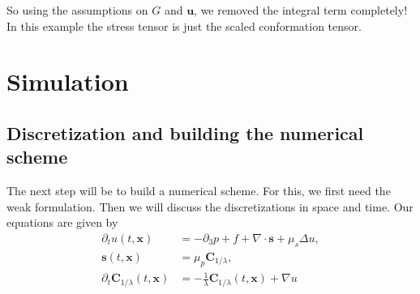 \documentclass[12pt,a4paper,twoside, open=right]{scrreprt}
\theoremstyle{definition}
\theoremstyle{plain}
\newcommand{\bfu}{\bm{u}}
\newcommand{\bfs}{\bm{s}}
\newcommand{\bfC}{\bm{C}}
\newcommand{\bfx}{\bm{x}}
\begin{document}
So using the assumptions on $G$ and $\bfu$, we removed the integral term completely! In this example the stress tensor is just the scaled conformation tensor. 
\chapter{Simulation}
\section{Discretization and building the numerical scheme}
The next step will be to build a numerical scheme. For this, we first need the weak formulation. Then we will discuss the discretizations in space and time. Our equations are given by 
\begin{align}
    \label{eq:transfeq1}
    \partial_t u(t,\bfx) &= -\partial_3 p + f +\nabla\cdot \bfs+\mu_s\Delta u,\\
    \label{eq:transfeq2}
    \bfs(t,\bfx)&=\mu_p\bfC_{1/\lambda},\\
    \partial_t\bfC_{1/\lambda}(t,\bfx) &= -\frac{1}{\lambda}\bfC_{1/\lambda}(t,\bfx)+\nabla u
    \label{eq:transfeq3}
\end{align}
\end{document}
